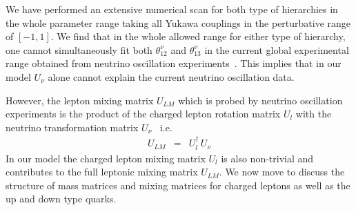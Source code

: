 \documentclass[english,10pt,aps,prd,a4paper,preprintnumbers,floatfix,nofootinbib,showpacs,superscriptaddress]{revtex4-1}
\begin{document}
We have performed an extensive numerical scan for both type of
hierarchies in the whole parameter range taking all Yukawa couplings
in the perturbative range of $[-1, 1]$. We find that in the whole
allowed range for either type of hierarchy, one cannot simultaneously
fit both $\theta^\nu_{12}$ and $\theta^\nu_{13}$ in the current global
experimental range obtained from neutrino oscillation
experiments~\cite{Forero:2014bxa}. This implies that in our model
$U_\nu$ alone cannot explain the current neutrino oscillation data.

However, the lepton mixing matrix $U_{LM}$ which is probed by neutrino
oscillation experiments is the product of the charged lepton rotation
matrix $U_l$ with the neutrino transformation matrix
$U_\nu$~\cite{Schechter:1980gr} i.e.
\begin{eqnarray}
 U_{LM} & = & U^\dagger_l \, U_\nu
 \label{ulm}
\end{eqnarray}
%
In our model the charged lepton mixing matrix $U_l$ is also
non-trivial and contributes to the full leptonic mixing matrix
$U_{LM}$. We now move to discuss the structure of mass matrices and
mixing matrices for charged leptons as well as the up and down type
quarks.  \\[-.2cm]
\end{document}
